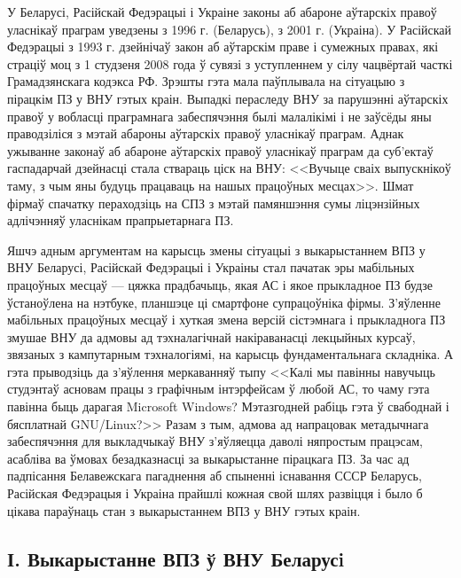 \documentclass[10pt, a5paper]{article}
\begin{document}
У Беларусі, Расійскай Федэрацыі і Украіне законы аб абароне аўтарскіх правоў
уласнікаў праграм уведзены з 1996 г. (Беларусь), з 2001 г. (Украіна). У Расійскай
Федэрацыі з 1993 г. дзейнічаў закон аб аўтарскім праве і сумежных правах, які
страціў моц з 1 студзеня 2008 года ў сувязі з уступленнем у сілу чацвёртай часткі
Грамадзянскага кодэкса РФ. Зрэшты гэта мала паўплывала на сітуацыю з пірацкім
ПЗ у ВНУ гэтых краін. Выпадкі пераследу ВНУ за парушэнні аўтарскіх правоў у
вобласці праграмнага забеспячэння былі малалікімі і не заўсёды яны праводзіліся
з мэтай абароны аўтарскіх правоў уласнікаў праграм. Аднак ужыванне законаў аб
абароне аўтарскіх правоў уласнікаў праграм да суб'ектаў гаспадарчай дзейнасці
стала ствараць ціск на ВНУ: <<Вучыце сваіх выпускнікоў таму, з чым яны будуць
працаваць на нашых працоўных месцах>>. Шмат фірмаў спачатку пераходзіць на СПЗ
з мэтай памяншэння сумы ліцэнзійных адлічэнняў уласнікам прапрыетарнага ПЗ.

Яшчэ адным аргументам на карысць змены сітуацыі з выкарыстаннем ВПЗ у ВНУ
Беларусі, Расійскай Федэрацыі і Украіны стал пачатак эры мабільных працоўных
месцаў --- цяжка прадбачыць, якая АС і якое прыкладное ПЗ будзе ўстаноўлена
на нэтбуке, планшэце ці смартфоне супрацоўніка фірмы. З'яўленне мабільных
працоўных месцаў і хуткая змена версій сістэмнага і прыкладнога ПЗ змушае
ВНУ да адмовы ад тэхналагічнай накіраванасці лекцыйных курсаў, звязаных
з кампутарным тэхналогіямі, на карысць фундаментальнага складніка. А гэта
прыводзіць да з'яўлення меркаванняў тыпу <<Калі мы павінны навучыць студэнтаў
асновам працы з графічным інтэрфейсам ў любой АС, то чаму гэта павінна быць
дарагая Microsoft Windows? Мэтазгодней рабіць гэта ў свабоднай і бясплатнай GNU/Linux?>>
Разам з тым, адмова ад напрацовак метадычнага забеспячэння для выкладчыкаў
ВНУ з'яўляецца даволі няпростым працэсам, асабліва ва ўмовах безадказнасці
за выкарыстанне пірацкага ПЗ. За час ад падпісання Белавежскага пагаднення
аб спыненні існавання СССР Беларусь, Расійская Федэрацыя і Украіна прайшлі
кожная свой шлях развіцця і было б цікава параўнаць стан з выкарыстаннем ВПЗ
у ВНУ гэтых краін.

\subsection*{І. Выкарыстанне ВПЗ ў ВНУ Беларусi}
\end{document}
